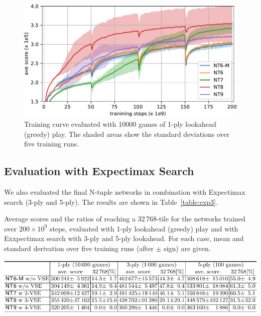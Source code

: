 \begin{figure}[ht]
 \includegraphics[width=.98\linewidth]{figures/plot-exp2.pdf}
 \caption{Training curve evaluated with 10000 games of 1-ply lookahead (greedy) play. The shaded areas show the standard deviations over five training runs.}
 \label{fig:exp2}
\end{figure}

\subsection{Evaluation with Expectimax Search}
We also evaluated the final N-tuple networks in combination with Expectimax search (3-ply and 5-ply).
The results are shown in Table~\ref{table:exp3}.

\begin{table}[ht]
 \caption{Average scores and the ratios of reaching a 32\,768-tile for the networks trained over $200\times 10^9$ steps, evaluated with 1-ply lookahead (greedy) play and with Exxpectimax search with 3-ply and 5-ply lookahead. For each case, mean and standard derivation over five training runs (after $\pm$ sign) are given.}
 \label{table:exp3}
 \centering\includegraphics[width=.99\linewidth]{figures/table-exp3.pdf}
\end{table}


